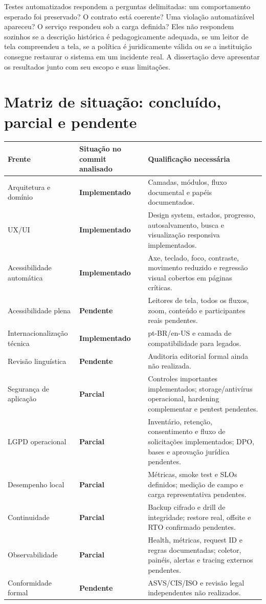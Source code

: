\documentclass[11pt,a4paper]{article}
\newcommand{\ok}{\textcolor{CavnTeal}{\textbf{Implementado}}}
\newcommand{\partialstatus}{\textcolor{CavnGold!80!black}{\textbf{Parcial}}}
\newcommand{\pendingstatus}{\textcolor{red!65!black}{\textbf{Pendente}}}
\begin{document}
Testes automatizados respondem a perguntas delimitadas: um comportamento esperado foi preservado? O contrato está coerente? Uma violação automatizável apareceu? O serviço respondeu sob a carga definida? Eles não respondem sozinhos se a descrição histórica é pedagogicamente adequada, se um leitor de tela compreendeu a tela, se a política é juridicamente válida ou se a instituição consegue restaurar o sistema em um incidente real. A dissertação deve apresentar os resultados junto com seu escopo e suas limitações.

\section{Matriz de situação: concluído, parcial e pendente}

\begin{longtable}{P{0.25\textwidth}P{0.25\textwidth}P{0.39\textwidth}}
\toprule
\textbf{Frente} & \textbf{Situação no commit analisado} & \textbf{Qualificação necessária} \\
\midrule
\endhead
\bottomrule
\endfoot
Arquitetura e domínio & \ok & Camadas, módulos, fluxo documental e papéis documentados. \\
UX/UI & \ok & Design system, estados, progresso, autosalvamento, busca e visualização responsiva implementados. \\
Acessibilidade automática & \ok & Axe, teclado, foco, contraste, movimento reduzido e regressão visual cobertos em páginas críticas. \\
Acessibilidade plena & \pendingstatus & Leitores de tela, todos os fluxos, zoom, conteúdo e participantes reais pendentes. \\
Internacionalização técnica & \ok & pt-BR/en-US e camada de compatibilidade para legados. \\
Revisão linguística & \pendingstatus & Auditoria editorial formal ainda não realizada. \\
Segurança de aplicação & \partialstatus & Controles importantes implementados; storage/antivírus operacional, hardening complementar e pentest pendentes. \\
LGPD operacional & \partialstatus & Inventário, retenção, consentimento e fluxo de solicitações implementados; DPO, bases e aprovação jurídica pendentes. \\
Desempenho local & \partialstatus & Métricas, smoke test e SLOs definidos; medição de campo e carga representativa pendentes. \\
Continuidade & \partialstatus & Backup cifrado e drill de integridade; restore real, offsite e RTO confirmado pendentes. \\
Observabilidade & \partialstatus & Health, métricas, request ID e regras documentadas; coletor, painéis, alertas e tracing externos pendentes. \\
Conformidade formal & \pendingstatus & ASVS/CIS/ISO e revisão legal independentes não realizados. \\
\end{longtable}
\end{document}
